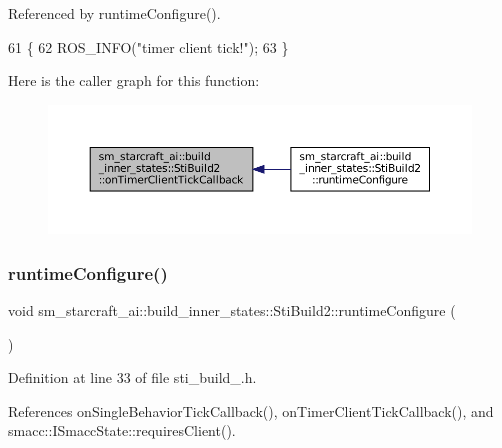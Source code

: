 Referenced by runtime\+Configure().


\begin{DoxyCode}
61   \{
62     ROS\_INFO(\textcolor{stringliteral}{"timer client tick!"});
63   \}
\end{DoxyCode}
Here is the caller graph for this function\+:
\nopagebreak
\begin{figure}[H]
\begin{center}
\leavevmode
\includegraphics[width=350pt]{structsm__starcraft__ai_1_1build__inner__states_1_1StiBuild2_af8ce2f1ad0fafe8a93d9545e312c7710_icgraph}
\end{center}
\end{figure}
\mbox{\label{structsm__starcraft__ai_1_1build__inner__states_1_1StiBuild2_a69f6a051fbfd9476762b804fbb06809a}} 
\subsubsection{\texorpdfstring{runtime\+Configure()}{runtimeConfigure()}}
{\footnotesize\ttfamily void sm\+\_\+starcraft\+\_\+ai\+::build\+\_\+inner\+\_\+states\+::\+Sti\+Build2\+::runtime\+Configure (\begin{DoxyParamCaption}{ }\end{DoxyParamCaption})\hspace{0.3cm}{\ttfamily [inline]}}



Definition at line 33 of file sti\+\_\+build\+\_.\+h.



References on\+Single\+Behavior\+Tick\+Callback(), on\+Timer\+Client\+Tick\+Callback(), and smacc\+::\+I\+Smacc\+State\+::requires\+Client().



